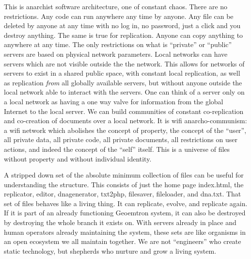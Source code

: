 This is anarchist software architecture, one of constant chaos. There
are no restrictions. Any code can run anywhere any time by anyone. Any
file can be deleted by anyone at any time with no log in, no password,
just a click and you destroy anything. The same is true for replication.
Anyone can copy anything to anywhere at any time. The only restrictions
on what is ``private'' or ``public'' servers are based on physical
network parameters. Local networks can have servers which are not
visible outside the the network. This allows for networks of servers to
exist in a shared public space, with constant local replication, as well
as replication \emph{from} all globally available servers, but without
anyone outside the local network able to interact with the servers. One
can think of a server only on a local network as having a one way valve
for information from the global Internet to the local server. We can
build communities of constant co-replication and co-creation of
documents over a local network. It is wifi anarcho-communism: a wifi
network which abolishes the concept of property, the concept of the
``user'', all private data, all private code, all private documents, all
restrictions on user actions, and indeed the concept of the ``self''
itself. This is a universe of files without property and without
individual identity.

A stripped down set of the absolute minimum collection of files can be
useful for understanding the structure. This consists of just the home
page index.html, the replicator, editor, dnagenerator, txt2php,
filesaver, fileloader, and dna.txt. That set of files behaves like a
living thing. It can replicate, evolve, and replicate again. If it is
part of an already functioning Geoemtron system, it can also be
destroyed by destroying the whole branch it exists on. With servers
already in place and human operators already maintaining the system,
these sets are like organisms in an open ecosystem we all maintain
together. We are not ``engineers'' who create static technology, but
shepherds who nurture and grow a living system.

